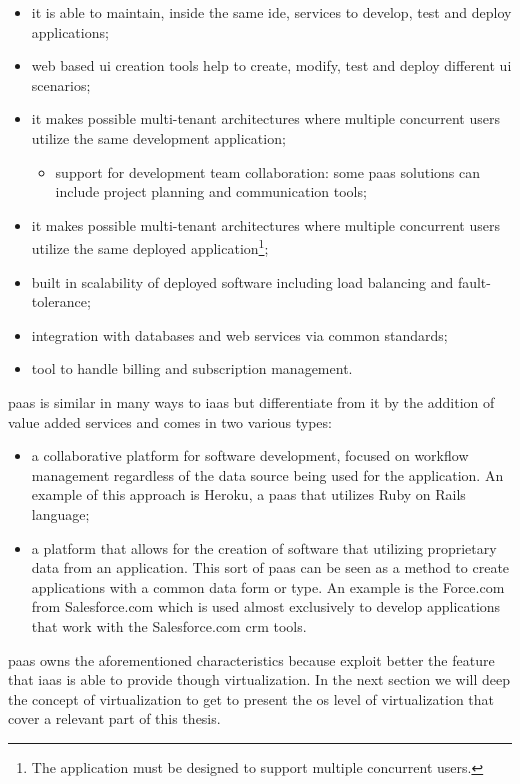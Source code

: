 \begin{itemize}
	\item{it is able to maintain, inside the same \ac{ide}, services to develop, test and deploy
		applications;}
	\item{web based \ac{ui} creation tools help to create, modify, test and deploy different \ac{ui}
		scenarios;}
	\item{it makes possible multi-tenant architectures where multiple concurrent users utilize the same
		development application;}
	\begin{itemize}
		\item{support for development team collaboration: some \ac{paas} solutions can include project
			planning and communication tools;}
	\end{itemize}
	\item{it makes possible multi-tenant architectures where multiple concurrent users utilize the same
		deployed application\footnote{The application must be designed to support multiple concurrent
			users.};}
	\item{built in scalability of deployed software including load balancing and fault-tolerance;}
	\item{integration with databases and web services via common standards;}
	\item{tool to handle billing and subscription management.}
\end{itemize}

\ac{paas} is similar in many ways to \ac{iaas} but differentiate from it by the addition of value added
services and comes in two various types:

\begin{itemize}
	\item{a collaborative platform for software development, focused on workflow management regardless
		of the data source being used for the application. An example of this approach is Heroku, a
		\ac{paas} that utilizes Ruby on Rails language;}
	\item{a platform that allows for the creation of software that utilizing proprietary data from an
		application. This sort of \ac{paas} can be seen as a method to create applications with a common
		data form or type. An example is the Force.com from Salesforce.com which is used almost exclusively
		to develop applications that work with the Salesforce.com \ac{crm} tools.}
\end{itemize}

\ac{paas} owns the aforementioned characteristics because exploit better the feature that \ac{iaas}
is able to provide though virtualization. In the next section we will deep the concept of virtualization
to get to present the \acs{os} level of virtualization that cover a relevant part of this thesis.

